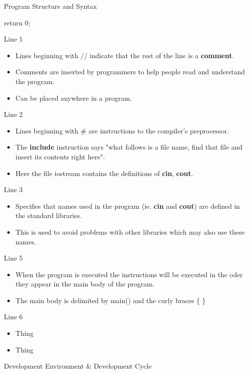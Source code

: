 \documentclass[../lecture1-introduction.tex]{subfiles}
\begin{document}
\begin{frame}[fragile]{Program Structure and Syntax}
\begin{cppcode}
{    return 0;
}
\end{cppcode}
    {
        Line 1
        \begin{itemize}
            \item Lines beginning with // indicate that the rest of the line
            is a \textbf{comment}.
            \item Comments are inserted by programmers to help people read
            and understand the program.
            \item Can be placed anywhere in a program.
        \end{itemize}
    }
    {
        Line 2
        \begin{itemize}
            \item Lines beginning with \# are instructions to the compiler's
            preprocessor.
            \item The \textbf{include} instruction says "what follows is a file name,
            find that file and insert its contents right here".
            \item Here the file iostream contains the definitions of
            \textbf{cin}, \textbf{cout}.
        \end{itemize}
    }
    {
        Line 3
        \begin{itemize}
            \item Specifies that names used in the program (ie. \textbf{cin} and
            \textbf{cout}) are defined in the standard libraries.
            \item This is used to avoid problems with other libraries which may
            also use these names.
        \end{itemize}
    }
    {
        Line 5
        \begin{itemize}
            \item When the program is executed the instructions will be executed
            in the oder they appear in the main body of the program.
            \item The main body is delimited by main() and the curly braces \{ \}
        \end{itemize}
    }
    {
        Line 6
        \begin{itemize}
            \item Thing
        \end{itemize}
    }
    {
        \begin{itemize}
            \item Thing
        \end{itemize}
    }
\end{frame}


\begin{frame}[fragile]{Development Environment \& Development Cycle}



\end{frame}

\end{document}
